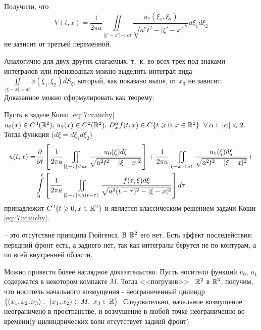 Получили, что 
\[
V(t, x)=\frac{1}{2\pi a}\iint\limits_{|\xi' -x'|<at}\frac{u_1(\xi_1, \xi_2)}{\sqrt{a^2t^2-|\xi' -x'|^2}}d\xi_1d\xi_2
\]
не зависит от третьей переменной. 

Аналогично для двух других слагаемых, т.~к. во всех трех под знаками интегралов или производных можно выделить интеграл вида $\displaystyle\iint\limits_{|\xi -x|=at}\phi (\xi_1, \xi_2)dS_{\xi}$, который, как показано выше, от $x_3$ не зависит. Доказанное можно сформулировать как теорему:
\begin{theorem}
Пусть в задаче Коши \eqref{eq::7::cauchy} $u_0(x)\in C^3(\bR^2),\, u_1(x)\in C^2(\bR^2),\, D_x^{\alpha}f(t,x)\in C\{t\geq 0, x\in\bR^2\}\ \forall\alpha :\ |\alpha |\leq 2$. Тогда функция ($d\xi =d\xi_1d\xi_2$)
\[
\begin{split}
u(t, x)=&\frac{\partial }{\partial t}\left[\frac{1}{2\pi a}\iint\limits_{|\xi - x|<at}\frac{u_0(\xi )d\xi}{\sqrt{a^2t^2-|\xi - x|^2}} \right]+ \frac{1}{2\pi a}\iint\limits_{|\xi - x|<at}\frac{u_1(\xi )d\xi}{\sqrt{a^2t^2-|\xi - x|^2}}+\\
&\int\limits_0^t\left[\frac{1}{2\pi a}\iint\limits_{|\xi - x|<a(t-\tau )}\frac{f(\tau ,\xi )d\xi}{\sqrt{a^2(t-\tau )^2-|\xi - x|^2}} \right]d\tau
\end{split}
\]
принадлежит $C^2\{t\geqslant 0, x\in\mathbb{R}^2 \}$ и является классическим решением задачи Коши \eqref{eq::7::cauchy}.
\end{theorem}
\begin{definition}
-- это отсутствие принципа Гюйгенса. В $\mathbb{R}^2$ его нет. Есть эффект последействия: передний фронт есть, а заднего нет, так как интегралы берутся не по контурам, а по всей внутренней области.
\end{definition}
Можно привести более наглядное доказательство. Пусть носители функций $u_0$, $u_1$ содержатся в некотором компакте $M$. Тогда <<погрузив>>~ $\mathbb{R}^2$ в $\mathbb{R}^3$, получим, что носитель начального возмущения - неограниченный цилиндр $\{(x_1, x_2, x_3): ~(x_1, x_2) \in M,~ x_3 \in \mathbb{R} \}$. Следовательно, начальное возмущение неограничено в пространстве, и возмущение в любой точке неограниченно во времени(у цилиндрических волн отсутствует задний фронт)








